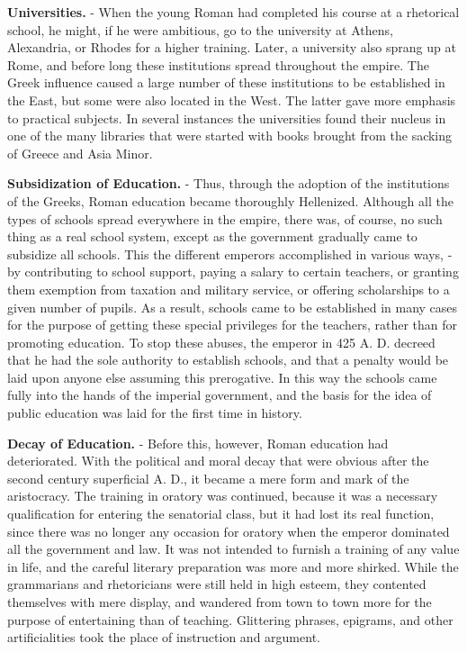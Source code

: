 \documentclass[]{book}
\begin{document}
\textbf{Universities.} - When the young Roman had completed his course at a rhetorical school, he might, if he were ambitious, go to the university at Athens, Alexandria, or Rhodes for a higher training. Later, a university also sprang up at Rome, and before long these institutions spread throughout the empire. The Greek influence caused a large number of these institutions to be established in the East, but some were also located in the West. The latter gave more emphasis to practical subjects. In several instances the universities found their nucleus in one of the many libraries that were started with books brought from the sacking of Greece and Asia Minor.

\textbf{Subsidization of Education.} - Thus, through the adoption of the institutions of the Greeks, Roman education became thoroughly Hellenized. Although all the types of schools spread everywhere in the empire, there was, of course, no such thing as a real school system, except as the government gradually came to subsidize all schools. This the different emperors accomplished in various ways, - by contributing to school support, paying a salary to certain teachers, or granting them exemption from taxation and military service, or offering scholarships to a given number of pupils. As a result, schools came to be established in many cases for the purpose of getting these special privileges for the teachers, rather than for promoting education. To stop these abuses, the emperor in 425 A. D. decreed that he had the sole authority to establish schools, and that a penalty would be laid upon anyone else assuming this prerogative. In this way the schools came fully into the hands of the imperial government, and the basis for the idea of public education was laid for the first time in history.

\textbf{Decay of Education.} - Before this, however, Roman education had deteriorated. With the political and moral decay that were obvious after the second century superficial A. D., it became a mere form and mark of the aristocracy. The training in oratory was continued, because it was a necessary qualification for entering the senatorial class, but it had lost its real function, since there was no longer any occasion for oratory when the emperor dominated all the government and law. It was not intended to furnish a training of any value in life, and the careful literary preparation was more and more shirked. While the grammarians and rhetoricians were still held in high esteem, they contented themselves with mere display, and wandered from town to town more for the purpose of entertaining than of teaching. Glittering phrases, epigrams, and other artificialities took the place of instruction and argument.
\end{document}
